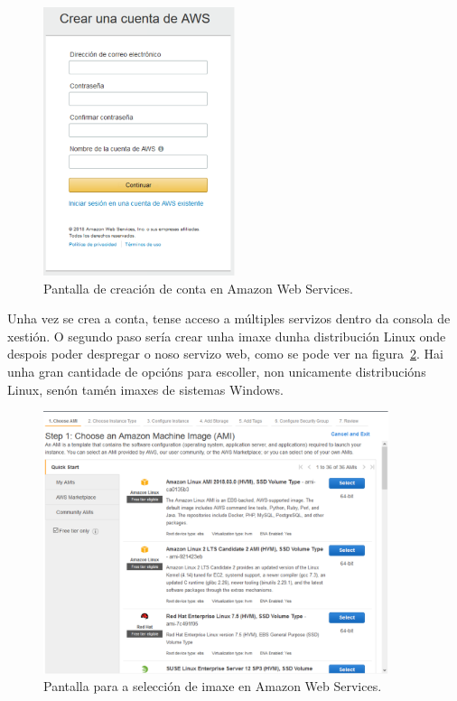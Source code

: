 \begin{figure}[h]
	\begin{center}
		\includegraphics[width=0.5\textwidth]{figures/capturas/AWSCrear}
		\caption{Pantalla de creación de conta en Amazon Web Services.}
		\label{fig:AWSCrear}
	\end{center}
\end{figure}


Unha vez se crea a conta, tense acceso a múltiples servizos dentro da consola de xestión. O segundo paso sería crear unha imaxe dunha distribución Linux onde despois poder despregar o noso servizo web, como se pode ver na figura~\ref{fig:AWSImaxes}. Hai unha gran cantidade de opcións para escoller, non unicamente distribucións Linux, senón tamén imaxes de sistemas Windows. 

\begin{figure}[h]
	\begin{center}
		\includegraphics[width=0.9\textwidth]{figures/capturas/AWSImaxes}
		\caption{Pantalla para a selección de imaxe en Amazon Web Services.}
		\label{fig:AWSImaxes}
	\end{center}
\end{figure}

